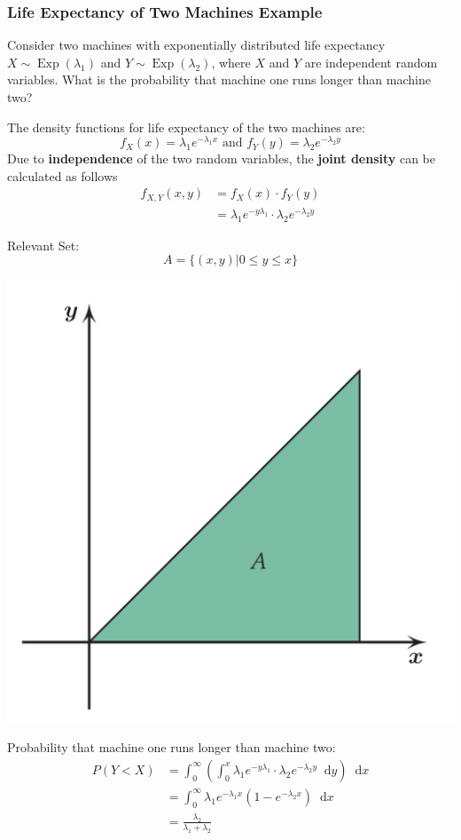 \documentclass[11pt]{article}
\theoremstyle{definition}
\newcommand*\diff{\mathop{}\!\mathrm{d}}
\newcommand*\Exp[1]{\mathop{\text{Exp}}\left(#1\right)}
\begin{document}
\subsubsection{Life Expectancy of Two Machines Example}
Consider two machines with exponentially distributed life expectancy $X\sim \Exp{\lambda_1}$ and $Y\sim\Exp{\lambda_2}$, where $X$ and $Y$ are independent random variables. What is the probability that machine one runs longer than machine two?

The density functions for life expectancy of the two machines are:
\begin{equation*}
	f_X(x) = \lambda_1 e^{-\lambda_1 x}\text{ and } f_Y(y) = \lambda_2 e^{-\lambda_2 y}
\end{equation*}
Due to \textbf{independence} of the two random variables, the \textbf{joint density} can be calculated as follows
\begin{align}
	f_{X,Y} (x,y) &= f_X(x) \cdot f_Y(y)\\
	&= \lambda_1 e^{-y\lambda_1} \cdot \lambda_2 e^{-\lambda_2 y}
\end{align}
\begin{minipage}{0.6\linewidth}
	Relevant Set:
	\begin{equation*}
		A = \{(x,y)|0\leq y\leq x\}
	\end{equation*}
\end{minipage}
\begin{minipage}{0.4\linewidth}
	\begin{center}
		\includegraphics[width=0.6\linewidth]{img/area_A_under_xy}
	\end{center}	
\end{minipage}
Probability that machine one runs longer than machine two:
\begin{align*}
	P(Y<X) &= \int_{0}^{\infty}(\int_{0}^{x} \lambda_1 e^{-y\lambda_1} \cdot \lambda_2 e^{-\lambda_2 y} \diff y )\diff x\\
	&= \int_{0}^{\infty} \lambda_1e^{-\lambda_1 x} (1 - e^{-\lambda_2 x})\diff x\\
	&= \frac{\lambda_2}{\lambda_1 + \lambda_2}
\end{align*}
\end{document}
